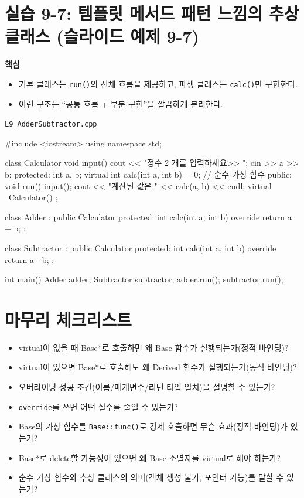 \documentclass[11pt,a4paper]{article}
\newcommand{\filetag}[1]{\texttt{\color{Accent}#1}}
\begin{document}
\section{실습 9-7: 템플릿 메서드 패턴 느낌의 추상 클래스 (슬라이드 예제 9-7)}
\begin{GoalBox}
\textbf{핵심}
\begin{itemize}[leftmargin=18pt]
  \item 기본 클래스는 \texttt{run()}의 전체 흐름을 제공하고,
        파생 클래스는 \texttt{calc()}만 구현한다.
  \item 이런 구조는 ``공통 흐름 + 부분 구현''을 깔끔하게 분리한다.
\end{itemize}
\end{GoalBox}

\noindent\filetag{L9\_AdderSubtractor.cpp}
\begin{cppcode}
#include <iostream>
using namespace std;

class Calculator {
    void input() {
        cout << "정수 2 개를 입력하세요>> ";
        cin >> a >> b;
    }
protected:
    int a, b;
    virtual int calc(int a, int b) = 0; // 순수 가상 함수
public:
    void run() {
        input();
        cout << "계산된 값은 " << calc(a, b) << endl;
    }
    virtual ~Calculator() {}
};

class Adder : public Calculator {
protected:
    int calc(int a, int b) override { return a + b; }
};

class Subtractor : public Calculator {
protected:
    int calc(int a, int b) override { return a - b; }
};

int main() {
    Adder adder;
    Subtractor subtractor;
    adder.run();
    subtractor.run();
}
\end{cppcode}

\section*{마무리 체크리스트}
\begin{GoalBox}
\begin{itemize}[leftmargin=18pt]
  \item virtual이 없을 때 Base*로 호출하면 왜 Base 함수가 실행되는가(정적 바인딩)?
  \item virtual이 있으면 Base*로 호출해도 왜 Derived 함수가 실행되는가(동적 바인딩)?
  \item 오버라이딩 성공 조건(이름/매개변수/리턴 타입 일치)을 설명할 수 있는가?
  \item \texttt{override}를 쓰면 어떤 실수를 줄일 수 있는가?
  \item Base의 가상 함수를 \texttt{Base::func()}로 강제 호출하면 무슨 효과(정적 바인딩)가 있는가?
  \item Base*로 delete할 가능성이 있으면 왜 Base 소멸자를 virtual로 해야 하는가?
  \item 순수 가상 함수와 추상 클래스의 의미(객체 생성 불가, 포인터 가능)를 말할 수 있는가?
\end{itemize}
\end{GoalBox}
\end{document}
